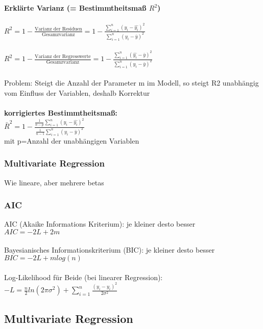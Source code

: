 \newpage
\textbf{Erklärte Varianz (= Bestimmtheitsmaß $R^2$)}\\\\
$R^2= 1 - \displaystyle \frac{\text{Varianz der Residuen}}{\text{Gesamzvarianz}} =1- \frac{\displaystyle\sum_{i=1}^{n} (y_i - \hat{y_i})^2}{\displaystyle \sum_{i=1}^{n} (y_i - \bar{y})^2}$\\\\
$\displaystyle R^2= 1 - \frac{\text{Varianz der Regresswerte}}{\text{Gesamzvarianz}} = 1 - \frac{\displaystyle \sum_{i=1}^{n} (\hat{y_i} - \bar{y})^2}{\displaystyle \sum_{i=1}^{n} (y_i - \bar{y})^2}$
\\\\
Problem: Steigt die Anzahl der Parameter m im Modell, so steigt R2 unabhängig vom Einfluss der Variablen, deshalb Korrektur\\\\
\textbf{korrigiertes Bestimmtheitsmaß:}\\
$\bar{R}^2=1- \frac{\displaystyle \frac{1}{n-p} \displaystyle\sum_{i=1}^{n} (y_i - \hat{y_i})^2}{\displaystyle \frac{1}{n-1} \displaystyle \sum_{i=1}^{n} (y_i - \bar{y})^2}$\\
mit p=Anzahl der unabhängigen Variablen

\subsubsection{Multivariate Regression}
Wie lineare, aber mehrere betas

\subsubsection{AIC}
AIC (Akaike Informations Kriterium): je kleiner desto besser\\
$AIC=-2L+2m$
\\\\
Bayesianisches Informationskriterium (BIC): je kleiner desto besser\\
$BIC=-2L+mlog(n)$
\\\\
Log-Likelihood für Beide (bei linearer Regression):\\
$-L=\displaystyle \frac{n}{2}ln(2\pi \sigma^2) + \displaystyle \sum_{i=1}^{n} \frac{(\hat{y_i} - y_i)^2}{2\sigma^2}$\\

\subsection{Multivariate Regression}


